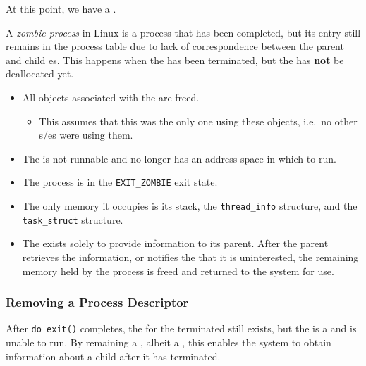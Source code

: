 At this point, we have a .

\begin{definition}\label{def:Zombie_Process}
  A \emph{zombie process} in Linux is a process that has been completed, but its entry still remains in the process table due to lack of correspondence between the parent and child es.
  This happens when the  has been terminated, but the  has \textbf{not} be deallocated yet.

  \begin{itemize}[noitemsep]
  \item All objects associated with the  are freed.
    \begin{itemize}[noitemsep]
    \item This assumes that this  was the only one using these objects, i.e.\ no other s/es were using them.
    \end{itemize}
  \item The  is not runnable and no longer has an address space in which to run.
  \item The process is in the \texttt{EXIT_ZOMBIE} exit state.
  \item The only memory it occupies is its  stack, the \texttt{thread_info} structure, and the \texttt{task_struct} structure.
  \item The  exists solely to provide information to its parent.
    After the parent retrieves the information, or notifies the  that it is uninterested, the remaining memory held by the process is freed and returned to the system for use.
  \end{itemize}
\end{definition}

\subsubsection{Removing a Process Descriptor}\label{subsubsec:Remove_Process_Descriptor}
After \texttt{do_exit()} completes, the  for the terminated  still exists, but the  is a  and is unable to run.
By remaining a , albeit a , this enables the system to obtain information about a child  after it has terminated.

